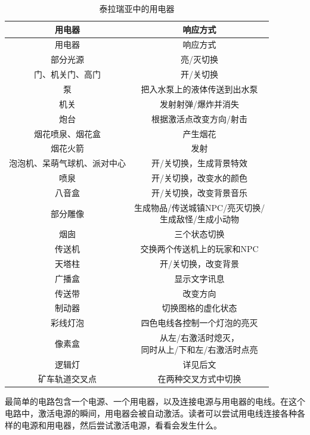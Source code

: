 \begin{longtable}{|c|c|}
\caption{泰拉瑞亚中的用电器}\label{yongdianqi}\\\hline
用电器		&	响应方式	\\\hline
\endfirsthead
\hline
用电器		&	响应方式	\\\hline
\endhead
\hline
\endfoot
部分光源	&	亮/灭切换	\\\hline
门、机关门、高门&	开/关切换	\\\hline
泵	&把入水泵上的液体传送到出水泵	\\\hline
机关	&	发射射弹/爆炸并消失	\\\hline
炮台&根据激活点改变方向/射击\\\hline
烟花喷泉、烟花盒&产生烟花\\\hline
烟花火箭&发射\\\hline
泡泡机、呆萌气球机、派对中心&开/关切换，生成背景特效\\\hline
喷泉&开/关切换，改变水的颜色\\\hline
八音盒&开/关切换，改变背景音乐\\\hline
部分雕像&\makecell{生成物品/传送城镇NPC/亮灭切换/\\生成敌怪/生成小动物}\\\hline
烟囱&三个状态切换\\\hline
传送机&交换两个传送机上的玩家和NPC\\\hline
天塔柱&开/关切换，改变背景\\\hline
广播盒&显示文字讯息\\\hline
传送带&改变方向\\\hline
制动器&切换图格的虚化状态\\\hline
彩线灯泡&四色电线各控制一个灯泡的亮灭\\\hline
像素盒&\makecell{从左/右激活时熄灭，\\同时从上/下和左/右激活时点亮}\\\hline
逻辑灯&详见后文\\\hline
矿车轨道交叉点&在两种交叉方式中切换
\end{longtable}

最简单的电路包含一个电源、一个用电器，以及连接电源与用电器的电线。在这个电路中，激活电源的瞬间，用电器会被自动激活。读者可以尝试用电线连接各种各样的电源和用电器，然后尝试激活电源，看看会发生什么。

